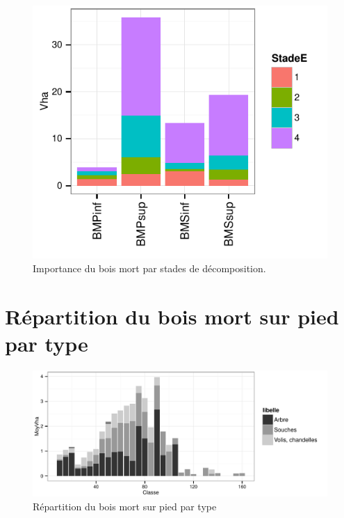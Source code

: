 \documentclass[a4paper]{book}\usepackage[]{graphicx}\usepackage[]{color}
\makeatletter
\def\maxwidth{ %
  \ifdim\Gin@nat@width>\linewidth
    \linewidth
  \else
    \Gin@nat@width
  \fi
}
\newenvironment{knitrout}{}{} %
\makeatother
\begin{document}
\begin{knitrout}
\begin{figure}[H]
{{\centering \includegraphics[width=\maxwidth]{Figures/BMStades-2} 

}

}\caption[Importance du bois mort par stades de décomposition]{Importance du bois mort par stades de décomposition.\label{fig:BMStades}}
\end{figure}


\end{knitrout}

\section{Répartition du bois mort sur pied par type}

\begin{knitrout}\footnotesize
{}\color{fgcolor}\begin{figure}[H]


{\centering \includegraphics[width=\maxwidth]{Figures/BMPtypo-1} 

}

\caption[Répartition du bois mort sur pied par type]{Répartition du bois mort sur pied par type\label{fig:BMPtypo}}
\end{figure}


\end{knitrout}
\end{document}
